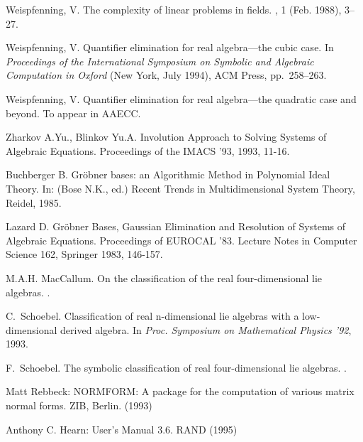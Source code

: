 \begin{thebibliography}{999}
{Weispfenning, V.}
\newblock The complexity of linear problems in fields.
, 1 (Feb. 1988), 3--27.


{Weispfenning, V.}
\newblock Quantifier elimination for real algebra---the cubic case.
\newblock In {\em Proceedings of the International Symposium on Symbolic and
  Algebraic Computation in Oxford\/} (New York, July 1994), ACM Press,
  pp.~258--263.

{Weispfenning, V.}
\newblock Quantifier elimination for real algebra---the quadratic case and
  beyond.
\newblock To appear in AAECC.


Zharkov A.Yu., Blinkov Yu.A. Involution Approach to Solving Systems
of Algebraic Equations. Proceedings of the IMACS '93, 1993, 11-16.

Buchberger B. Gr\"obner bases: an Algorithmic Method in Polynomial
Ideal Theory. In: (Bose N.K., ed.) Recent Trends in Multidimensional
System Theory, Reidel, 1985.

Lazard D. Gr\"obner Bases, Gaussian Elimination and Resolution of
Systems of Algebraic Equations. Proceedings of EUROCAL '83.
Lecture Notes in Computer Science 162, Springer 1983, 146-157.


M.A.H. MacCallum.
\newblock On the classification of the real four-dimensional lie algebras.
.

C.~Schoebel.
\newblock Classification of real n-dimensional lie algebras with a
  low-dimensional derived algebra.
\newblock In {\em Proc. {Symposium on Mathematical Physics} '92}, 1993.

F.~Schoebel.
\newblock The symbolic classification of real four-dimensional lie algebras.
.


 Matt Rebbeck: NORMFORM: A {\REDUCE} package for the 
computation of various matrix normal forms. ZIB, Berlin. (1993)

 Anthony C. Hearn: {\REDUCE} User's Manual 3.6.
	RAND (1995)


\end{thebibliography}
